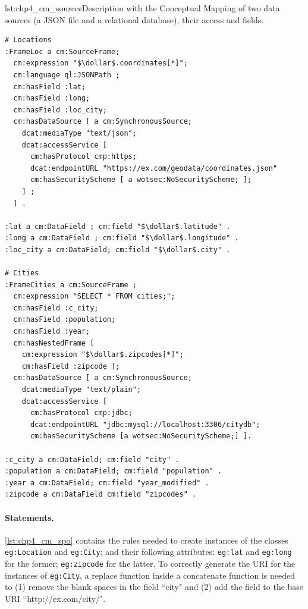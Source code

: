 \begin{captionedlisting}{lst:chp4_cm_sources}{Description with the Conceptual Mapping of two data sources (a JSON file and a relational database), their access and fields.}
\centering
{\begin{lstlisting}[language=concm,firstnumber=1]
# Locations
:FrameLoc a cm:SourceFrame;
  cm:expression "$\dollar$.coordinates[*]";
  cm:language ql:JSONPath ;
  cm:hasField :lat;
  cm:hasField :long;
  cm:hasField :loc_city;
  cm:hasDataSource [ a cm:SynchronousSource;
    dcat:mediaType "text/json";
    dcat:accessService [
      cm:hasProtocol cmp:https;
      dcat:endpointURL "https://ex.com/geodata/coordinates.json" 
      cm:hasSecurityScheme [ a wotsec:NoSecurityScheme; ];
    ] ;
  ] .

:lat a cm:DataField ; cm:field "$\dollar$.latitude" .
:long a cm:DataField ; cm:field "$\dollar$.longitude" .
:loc_city a cm:DataField; cm:field "$\dollar$.city" .

# Cities
:FrameCities a cm:SourceFrame ;
  cm:expression "SELECT * FROM cities;";
  cm:hasField :c_city;
  cm:hasField :population;
  cm:hasField :year;
  cm:hasNestedFrame [
    cm:expression "$\dollar$.zipcodes[*]";
    cm:hasField :zipcode ];
  cm:hasDataSource [ a cm:SynchronousSource;
    dcat:mediaType "text/plain";
    dcat:accessService [
      cm:hasProtocol cmp:jdbc;
      dcat:endpointURL "jdbc:mysql://localhost:3306/citydb";
      cm:hasSecurityScheme [a wotsec:NoSecurityScheme;] ].

:c_city a cm:DataField; cm:field "city" .
:population a cm:DataField; cm:field "population" .
:year a cm:DataField; cm:field "year_modified" .
:zipcode a cm:DataField cm:field "zipcodes" .
\end{lstlisting}}
\end{captionedlisting}


\noindent\paragraph{\textbf{Statements.}} \cref{lst:chp4_cm_spo} contains the rules needed to create instances of the classes \texttt{eg:Location} and \texttt{eg:City}; and their following attributes: \texttt{eg:lat} and \texttt{eg:long} for the former; \texttt{eg:zipcode} for the latter. To correctly generate the URI for the instances of \texttt{eg:City}, a replace function inside a concatenate function is needed to (1) remove the blank spaces in the field ``city" and (2) add the field to the base URI ``http://ex.com/city/".


